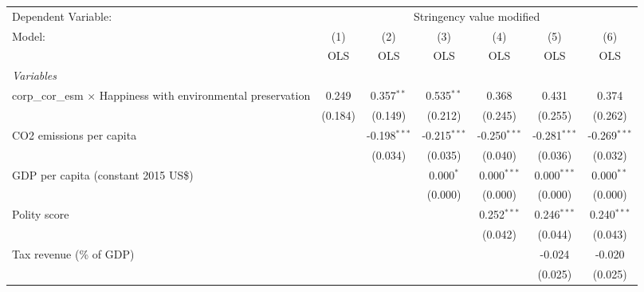 
\begingroup
\centering
\begin{tabular}{lcccccc}
   \toprule
   Dependent Variable: & \multicolumn{6}{c}{Stringency value modified}\\
   Model:                                                               & (1)     & (2)            & (3)            & (4)            & (5)            & (6)\\  
                                                                        &  OLS    & OLS            & OLS            & OLS            & OLS            & OLS\\  
   \midrule
   \emph{Variables}\\
   corp\_cor\_esm $\times$ Happiness with environmental preservation    & 0.249   & 0.357$^{**}$   & 0.535$^{**}$   & 0.368          & 0.431          & 0.374\\   
                                                                        & (0.184) & (0.149)        & (0.212)        & (0.245)        & (0.255)        & (0.262)\\   
   CO2 emissions per capita                                             &         & -0.198$^{***}$ & -0.215$^{***}$ & -0.250$^{***}$ & -0.281$^{***}$ & -0.269$^{***}$\\   
                                                                        &         & (0.034)        & (0.035)        & (0.040)        & (0.036)        & (0.032)\\   
   GDP per capita (constant 2015 US\$)                                  &         &                & 0.000$^{*}$    & 0.000$^{***}$  & 0.000$^{***}$  & 0.000$^{**}$\\   
                                                                        &         &                & (0.000)        & (0.000)        & (0.000)        & (0.000)\\   
   Polity score                                                         &         &                &                & 0.252$^{***}$  & 0.246$^{***}$  & 0.240$^{***}$\\   
                                                                        &         &                &                & (0.042)        & (0.044)        & (0.043)\\   
   Tax revenue (\% of GDP)                                              &         &                &                &                & -0.024         & -0.020\\   
                                                                        &         &                &                &                & (0.025)        & (0.025)\\   

\end{tabular}

